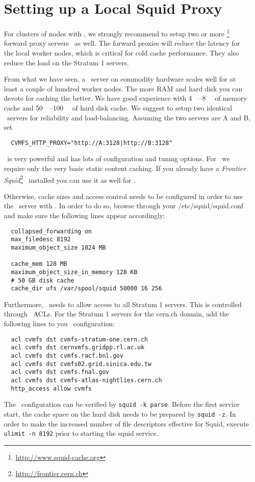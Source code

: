 \chapter{Setting up a Local Squid Proxy}
\label{sct:squid}

For clusters of nodes with \cvmfs, we strongly recommend to setup two or more \squid\footnote{\url{http://www.squid-cache.org}} forward proxy servers~\cite{squid99, bloomsquid00} as well.
The forward proxies will reduce the latency for the local worker nodes, which is critical for cold cache performance. 
They also reduce the load on the Stratum 1 servers.

From what we have seen, a \squid\ server on commodity hardware scales well for at least a couple of hundred worker nodes.
The more RAM and hard disk you can devote for caching the better.
We have good experience with \SIrange{4}{8}{\giga\byte} of memory cache and \SIrange{50}{100}{\giga\byte} of hard disk cache.
We suggest to setup two identical \squid\ servers for reliability and load-balancing.
Assuming the two servers are A and B, set
\begin{verbatim}
  CVMFS_HTTP_PROXY="http://A:3128|http://B:3128"
\end{verbatim}

\squid\ is very powerful and has lots of configuration and tuning options.
For \cvmfs\ we require only the very basic static content caching.
If you already have a \emph{Frontier Squid}\footnote{\url{http://frontier.cern.ch}}~\cite{frontier08, frontier10} installed you can use it as well for \cvmfs.

Otherwise, cache sizes and access control needs to be configured in order to use the \squid\ server with \cvmfs.
In order to do so, browse through your /etc/squid/squid.conf and make sure the following lines appear accordingly:
\begin{verbatim}
  collapsed_forwarding on
  max_filedesc 8192
  maximum_object_size 1024 MB

  cache_mem 128 MB
  maximum_object_size_in_memory 128 KB
  # 50 GB disk cache
  cache_dir ufs /var/spool/squid 50000 16 256
\end{verbatim}

Furthermore, \squid\ needs to allow access to all Stratum 1 servers.
This is controlled through \squid\ ACLs.
For the Stratum 1 servers for the cern.ch domain, add the following lines to you \squid\ configuration:
\begin{verbatim}
  acl cvmfs dst cvmfs-stratum-one.cern.ch
  acl cvmfs dst cernvmfs.gridpp.rl.ac.uk
  acl cvmfs dst cvmfs.racf.bnl.gov
  acl cvmfs dst cvmfs02.grid.sinica.edu.tw
  acl cvmfs dst cvmfs.fnal.gov
  acl cvmfs dst cvmfs-atlas-nightlies.cern.ch
  http_access allow cvmfs
\end{verbatim}

The \squid\ configuration can be verified by \texttt{squid -k parse}.
Before the first service start, the cache space on the hard disk needs to be prepared by \texttt{squid -z}.
In order to make the increased number of file descriptors effective for Squid, execute \texttt{ulimit -n 8192} prior to starting the squid service.
